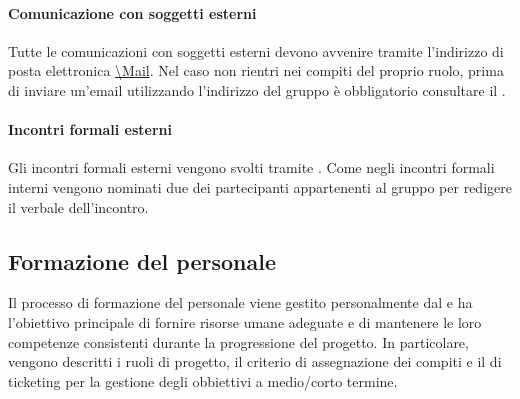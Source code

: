 \paragraph*{Comunicazione con soggetti esterni}
Tutte le comunicazioni con soggetti esterni devono avvenire tramite l'indirizzo di posta elettronica \url{\Mail}. Nel caso non rientri nei compiti del proprio ruolo, prima di inviare un'email utilizzando l'indirizzo del gruppo è obbligatorio consultare il \RdP{}.
\paragraph*{Incontri formali esterni}
Gli incontri formali esterni vengono svolti tramite . Come negli incontri formali interni vengono nominati due dei partecipanti appartenenti al gruppo per redigere il verbale dell'incontro. 



\subsection{Formazione del personale}

Il processo di formazione del personale viene gestito personalmente dal \RdP{} e ha l'obiettivo principale di fornire risorse umane adeguate e di mantenere le loro competenze consistenti durante la progressione del progetto. In particolare, vengono descritti i ruoli di progetto, il criterio di assegnazione dei compiti e il  di ticketing per la gestione degli obbiettivi a medio/corto termine.
